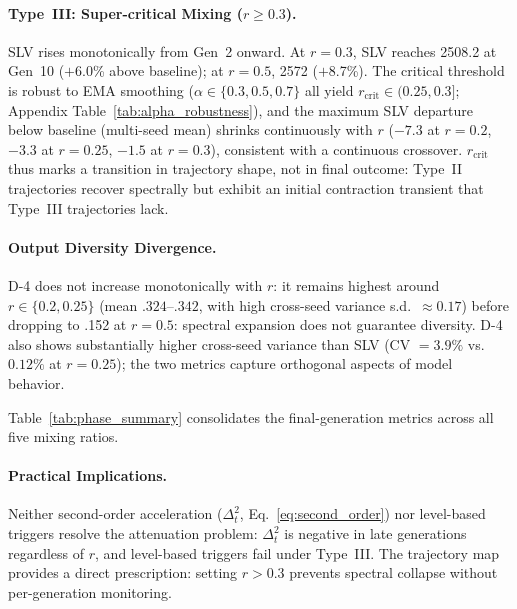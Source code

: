\paragraph{Type~III: Super-critical Mixing ($r \geq 0.3$).}
SLV rises monotonically from Gen~2 onward.
At $r{=}0.3$, SLV reaches 2508.2 at Gen~10 ($+$6.0\% above baseline); at $r{=}0.5$, 2572 ($+$8.7\%).
The critical threshold is robust to EMA smoothing ($\alpha \in \{0.3, 0.5, 0.7\}$ all yield $r_{\text{crit}} \in (0.25, 0.3]$; Appendix Table~\ref{tab:alpha_robustness}), and the maximum SLV departure below baseline (multi-seed mean) shrinks continuously with $r$ ($-7.3$ at $r{=}0.2$, $-3.3$ at $r{=}0.25$, $-1.5$ at $r{=}0.3$), consistent with a continuous crossover.
$r_{\text{crit}}$ thus marks a transition in trajectory shape, not in final outcome: Type~II trajectories recover spectrally but exhibit an initial contraction transient that Type~III trajectories lack.

\paragraph{Output Diversity Divergence.}
D-4 does not increase monotonically with $r$: it remains highest around $r \in \{0.2, 0.25\}$ (mean $.324$--$.342$, with high cross-seed variance s.d.\ $\approx 0.17$) before dropping to .152 at $r{=}0.5$: spectral expansion does not guarantee diversity.
D-4 also shows substantially higher cross-seed variance than SLV (CV $= 3.9\%$ vs.\ $0.12\%$ at $r{=}0.25$); the two metrics capture orthogonal aspects of model behavior.

Table~\ref{tab:phase_summary} consolidates the final-generation metrics across all five mixing ratios.

\paragraph{Practical Implications.}
Neither second-order acceleration ($\Delta^2_t$, Eq.~\ref{eq:second_order}) nor level-based triggers resolve the attenuation problem: $\Delta^2_t$ is negative in late generations regardless of $r$, and level-based triggers fail under Type~III.
The trajectory map provides a direct prescription: setting $r > 0.3$ prevents spectral collapse without per-generation monitoring.

